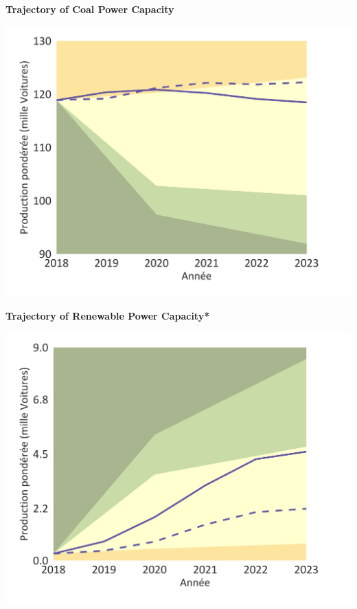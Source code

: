 \documentclass[10pt,table,a4]{article}\usepackage[]{graphicx}\usepackage[]{color}
\begin{document}
	\begin{minipage}[t]{.49\linewidth}
		\textbf{Trajectory of Coal Power Capacity }
		
		\includegraphics[trim = {0 0cm 0 0},width=1\linewidth]{ReportOutputs/Fig14}
		
		\textbf{Trajectory of Renewable Power Capacity* }
		
		\includegraphics[trim = {0 0cm 0 0},width=.99\linewidth]{ReportOutputs/Fig15}
	\end{minipage}	
	\hspace{.02\linewidth}
\end{document}

